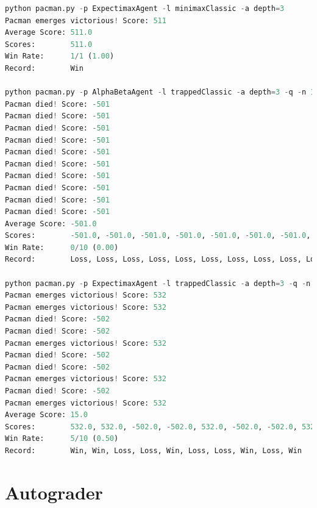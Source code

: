 \documentclass{report}
\begin{document}
            \begin{lstlisting}[language=Python, caption=Resultados del agente Expectimax]
python pacman.py -p ExpectimaxAgent -l minimaxClassic -a depth=3
Pacman emerges victorious! Score: 511
Average Score: 511.0
Scores:        511.0
Win Rate:      1/1 (1.00)
Record:        Win

python pacman.py -p AlphaBetaAgent -l trappedClassic -a depth=3 -q -n 10
Pacman died! Score: -501
Pacman died! Score: -501
Pacman died! Score: -501
Pacman died! Score: -501
Pacman died! Score: -501
Pacman died! Score: -501
Pacman died! Score: -501
Pacman died! Score: -501
Pacman died! Score: -501
Pacman died! Score: -501
Average Score: -501.0
Scores:        -501.0, -501.0, -501.0, -501.0, -501.0, -501.0, -501.0, -501.0, -501.0, -501.0
Win Rate:      0/10 (0.00)
Record:        Loss, Loss, Loss, Loss, Loss, Loss, Loss, Loss, Loss, Loss

python pacman.py -p ExpectimaxAgent -l trappedClassic -a depth=3 -q -n 10
Pacman emerges victorious! Score: 532
Pacman emerges victorious! Score: 532
Pacman died! Score: -502
Pacman died! Score: -502
Pacman emerges victorious! Score: 532
Pacman died! Score: -502
Pacman died! Score: -502
Pacman emerges victorious! Score: 532
Pacman died! Score: -502
Pacman emerges victorious! Score: 532
Average Score: 15.0
Scores:        532.0, 532.0, -502.0, -502.0, 532.0, -502.0, -502.0, 532.0, -502.0, 532.0
Win Rate:      5/10 (0.50)
Record:        Win, Win, Loss, Loss, Win, Loss, Loss, Win, Loss, Win
            \end{lstlisting}
      \clearpage\section{Autograder}
\end{document}
